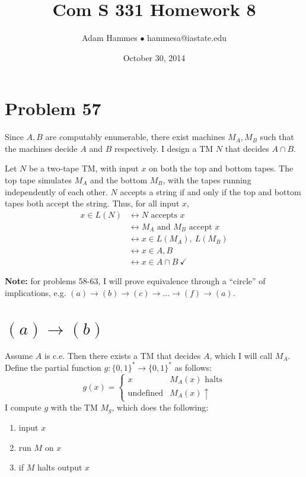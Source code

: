 \documentclass[11pt]{article}
\let\iff\leftrightarrow
\let\imp\rightarrow
\begin{document}
\title{Com S 331 Homework 8}
\author{Adam Hammes $\bullet$ hammesa@iastate.edu}
\date{October 30, 2014}
\maketitle

\section*{Problem 57}

Since $A, B$ are computably enumerable, there exist machines $M_A, M_B$ such that the machines decide $A$ and $B$ respectively.
I design a TM $N$ that decides $A \cap B$.

Let $N$ be a two-tape TM, with input $x$ on both the top and bottom tapes. 
The top tape simulates $M_A$ and the bottom $M_B$, with the tapes running independently of each other.
$N$ accepts a string if and only if the top and bottom tapes both accept the string. Thus, for all input $x$,
\begin{align*}
	x \in L(N) &\iff N \text{ accepts } x \\
	&\iff M_A \text{ and } M_B \text{ accept } x \\
	&\iff x \in L(M_A),\ L(M_B) \\
	&\iff x \in A, B \\
	&\iff x \in A \cap B \ \checkmark
\end{align*}


\textbf{Note:} for problems 58-63, I will prove equivalence through a ``circle'' of implications, e.g. $(a) \imp (b) \imp (c) \imp \ldots \imp (f) \imp (a)$.

\section*{$(a) \imp (b)$}

Assume $A$ is c.e.
Then there exists a TM that decides $A$, which I will call $M_A$.
Define the partial function $g: \{0,1\}^* \imp \{0,1\}^* $ as follows:
\[g(x) =
	\begin{cases}
		x & M_A(x) \text{ halts} \\
		\text{undefined} & M_A(x) \uparrow
	\end{cases}
\]
I compute $g$ with the TM $M_g$, which does the following:
\begin{enumerate}
	\item input $x$
	\item run $M$ on $x$
	\item if $M$ halts output $x$
\end{enumerate}
\end{document}
